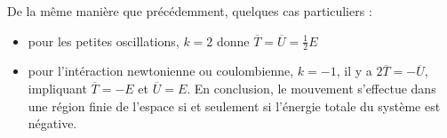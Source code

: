 De la m\^eme mani\`ere que pr\'ec\'edemment, quelques cas particuliers :
\begin{itemize}
	\item pour les petites oscillations, $k=2$ donne $\overline{T} = \overline{U} = \frac{1}{2}E$
	\item pour l'int\'eraction newtonienne ou coulombienne, $k=-1$, il y a $2\overline{T} = -\overline{U}$, impliquant $\overline{T} = -E$ et $\overline{U} = E$. En conclusion, le mouvement s'effectue dans une r\'egion finie de l'espace si et seulement si l'\'energie totale du syst\`eme est n\'egative.
\end{itemize}
